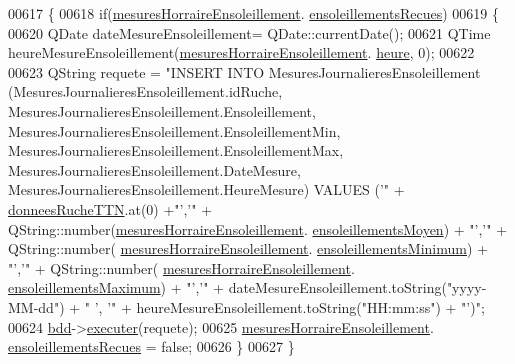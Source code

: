 \begin{DoxyCode}
00617 \{
00618     \textcolor{keywordflow}{if}(\hyperlink{class_ruche_a5e57df1ce7805b1ab0f6d8ef37504582}{mesuresHorraireEnsoleillement}.
      \hyperlink{struct_mesures_horaire_ensoleillement_a78d40966edb1ace93776ba33edfc5151}{ensoleillementsRecues})
00619     \{
00620         QDate dateMesureEnsoleillement= QDate::currentDate();
00621         QTime heureMesureEnsoleillement(\hyperlink{class_ruche_a5e57df1ce7805b1ab0f6d8ef37504582}{mesuresHorraireEnsoleillement}.
      \hyperlink{struct_mesures_horaire_ensoleillement_a478cf936fa746f384445cf5077206454}{heure}, 0);
00622 
00623         QString requete = \textcolor{stringliteral}{"INSERT INTO MesuresJournalieresEnsoleillement
       (MesuresJournalieresEnsoleillement.idRuche, MesuresJournalieresEnsoleillement.Ensoleillement,
       MesuresJournalieresEnsoleillement.EnsoleillementMin, MesuresJournalieresEnsoleillement.EnsoleillementMax, MesuresJournalieresEnsoleillement.DateMesure,
       MesuresJournalieresEnsoleillement.HeureMesure) VALUES ('"} + \hyperlink{class_ruche_a4556832042641c08a6ef2ab9d80d771e}{donneesRucheTTN}.at(0) +\textcolor{stringliteral}{"','"} + 
      QString::number(\hyperlink{class_ruche_a5e57df1ce7805b1ab0f6d8ef37504582}{mesuresHorraireEnsoleillement}.
      \hyperlink{struct_mesures_horaire_ensoleillement_a41c11dd16f5e42cf8b4882f98b9cee49}{ensoleillementsMoyen}) + \textcolor{stringliteral}{"','"} + QString::number(
      \hyperlink{class_ruche_a5e57df1ce7805b1ab0f6d8ef37504582}{mesuresHorraireEnsoleillement}.
      \hyperlink{struct_mesures_horaire_ensoleillement_a5d1165f40806663a3fd40ee4408c78f1}{ensoleillementsMinimum}) + \textcolor{stringliteral}{"','"} + QString::number(
      \hyperlink{class_ruche_a5e57df1ce7805b1ab0f6d8ef37504582}{mesuresHorraireEnsoleillement}.
      \hyperlink{struct_mesures_horaire_ensoleillement_adc848a942c5dcb0984b4c346f07e6f09}{ensoleillementsMaximum}) + \textcolor{stringliteral}{"','"} + dateMesureEnsoleillement.toString(\textcolor{stringliteral}{"yyyy-MM-dd"}) + \textcolor{stringliteral}{"
      ', '"} + heureMesureEnsoleillement.toString(\textcolor{stringliteral}{"HH:mm:ss"}) + \textcolor{stringliteral}{"')"};
00624         \hyperlink{class_ruche_a8577fdedabdecd98652e338e83bb3b65}{bdd}->\hyperlink{class_base_de_donnees_aa8de5f8f8bb17edc43f5c0ee33712081}{executer}(requete);
00625         \hyperlink{class_ruche_a5e57df1ce7805b1ab0f6d8ef37504582}{mesuresHorraireEnsoleillement}.
      \hyperlink{struct_mesures_horaire_ensoleillement_a78d40966edb1ace93776ba33edfc5151}{ensoleillementsRecues} = \textcolor{keyword}{false};
00626     \}
00627 \}
\end{DoxyCode}
\mbox{\label{class_ruche_ac52e79446c5629645e02e27d2a01e56c}} 

